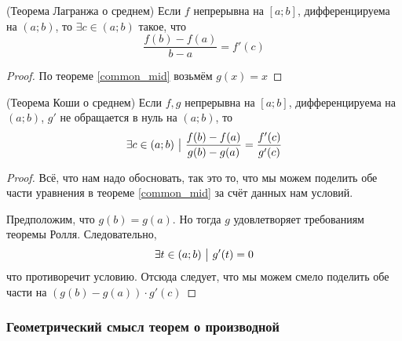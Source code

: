 \begin{corollary} (Теорема Лагранжа о среднем)
	Если $f$ непрерывна на $[a; b]$, дифференцируема на $(a; b)$, то $\exists c \in (a; b)$ такое, что
	\[
		\frac{f(b) - f(a)}{b - a} = f'(c)
	\]
\end{corollary}

\begin{proof}
	По теореме \ref{common_mid} возьмём $g(x) = x$
\end{proof}

\begin{corollary} (Теорема Коши о среднем)
	Если $f, g$ непрерывна на $[a; b]$, дифференцируема на $(a; b)$, $g'$ не обращается в нуль на $(a; b)$, то
	\[
		\exists c \in (a; b) \ \big|\  \frac{f(b) - f(a)}{g(b) - g(a)} = \frac{f'(c)}{g'(c)}
	\]
\end{corollary}

\begin{proof}
	Всё, что нам надо обосновать, так это то, что мы можем поделить обе части уравнения в теореме \ref{common_mid} за счёт данных нам условий.
	
	Предположим, что $g(b) = g(a)$. Но тогда $g$ удовлетворяет требованиям теоремы Ролля. Следовательно,
	\[
		\exists t \in (a; b) \ \big|\  g'(t) = 0
	\]
	что противоречит условию. Отсюда следует, что мы можем смело поделить обе части на $(g(b) - g(a)) \cdot g'(c)$
\end{proof}

\subsubsection*{Геометрический смысл теорем о производной}

